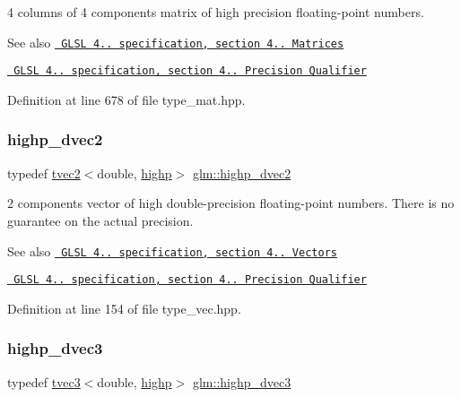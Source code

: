 4 columns of 4 components matrix of high precision floating-\/point numbers.

\begin{DoxySeeAlso}{See also}
\href{http://www.opengl.org/registry/doc/GLSLangSpec.4.20.8.pdf}{\texttt{ G\+L\+SL 4.. specification, section 4.. Matrices}} 

\href{http://www.opengl.org/registry/doc/GLSLangSpec.4.20.8.pdf}{\texttt{ G\+L\+SL 4.. specification, section 4.. Precision Qualifier}} 
\end{DoxySeeAlso}


Definition at line 678 of file type\+\_\+mat.\+hpp.

\mbox{\label{group__core__precision_ga74ad90a083be6c50f6c285d6ab15a198}} 
\subsubsection{\texorpdfstring{highp\_dvec2}{highp\_dvec2}}
{\footnotesize\ttfamily typedef \mbox{\hyperlink{structglm_1_1tvec2}{tvec2}}$<$double, \mbox{\hyperlink{namespaceglm_a0f04f086094c747d227af4425893f545ac6f7eab42eacbb10d59a58e95e362074}{highp}}$>$ \mbox{\hyperlink{group__core__precision_ga74ad90a083be6c50f6c285d6ab15a198}{glm\+::highp\+\_\+dvec2}}}

2 components vector of high double-\/precision floating-\/point numbers. There is no guarantee on the actual precision.

\begin{DoxySeeAlso}{See also}
\href{http://www.opengl.org/registry/doc/GLSLangSpec.4.20.8.pdf}{\texttt{ G\+L\+SL 4.. specification, section 4.. Vectors}} 

\href{http://www.opengl.org/registry/doc/GLSLangSpec.4.20.8.pdf}{\texttt{ G\+L\+SL 4.. specification, section 4.. Precision Qualifier}} 
\end{DoxySeeAlso}


Definition at line 154 of file type\+\_\+vec.\+hpp.

\mbox{\label{group__core__precision_ga54e097f7cd1f1cd46cc47eec67218bd3}} 
\subsubsection{\texorpdfstring{highp\_dvec3}{highp\_dvec3}}
{\footnotesize\ttfamily typedef \mbox{\hyperlink{structglm_1_1tvec3}{tvec3}}$<$double, \mbox{\hyperlink{namespaceglm_a0f04f086094c747d227af4425893f545ac6f7eab42eacbb10d59a58e95e362074}{highp}}$>$ \mbox{\hyperlink{group__core__precision_ga54e097f7cd1f1cd46cc47eec67218bd3}{glm\+::highp\+\_\+dvec3}}}

